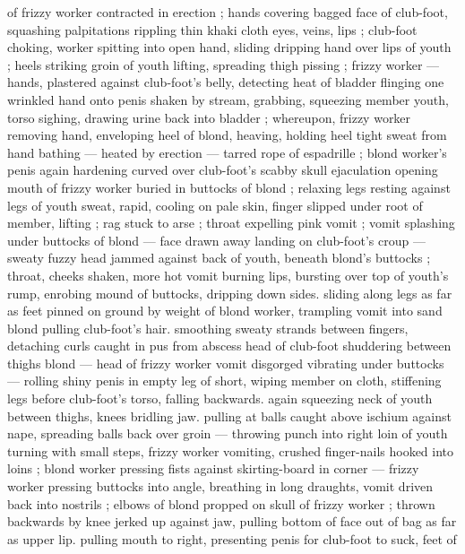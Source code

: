 of frizzy worker contracted in erection ; hands covering bagged face 
of club-foot, squashing palpitations rippling thin khaki cloth {\col} eyes, 
veins, lips ; club-foot choking, worker spitting into open hand, sliding 
dripping hand over lips of youth ; heels striking groin of youth lifting, 
spreading thigh {\col} pissing ; frizzy worker --- hands, plastered against 
club-foot's belly, detecting heat of bladder {\dashcom} flinging one wrinkled 
hand onto penis shaken by stream, grabbing, squeezing member {\col}
youth, torso sighing, drawing urine back into bladder ; whereupon, 
frizzy worker removing hand, enveloping heel of blond, heaving, 
holding heel tight {\col} sweat from hand bathing --- heated by erection 
--- tarred rope of espadrille ; blond worker's penis again hardening 
curved over club-foot's scabby skull {\crpage} ejaculation opening mouth of 
frizzy worker buried in buttocks of blond ; relaxing legs resting 
against legs of youth {\col} sweat, rapid, cooling on pale skin, finger 
slipped under root of member, lifting ; rag stuck to arse ; throat 
expelling pink vomit ; vomit splashing under buttocks of blond --- 
face drawn away {\dashcom} landing on club-foot's croup --- sweaty fuzzy 
head jammed against back of youth, beneath blond's buttocks ; 
throat, cheeks shaken, more hot vomit burning lips, bursting over top 
of youth's rump, enrobing mound of buttocks, dripping down sides. 
sliding along legs as far as feet pinned on ground by weight of blond 
worker, trampling vomit into sand {\col} blond pulling club-foot's hair. 
smoothing sweaty strands between fingers, detaching curls caught in 
pus from abscess {\col} head of club-foot shuddering between thighs 
blond --- head of frizzy worker vomit disgorged vibrating under 
buttocks --- rolling shiny penis in empty leg of short, wiping member 
on cloth, stiffening legs before club-foot's torso, falling backwards. 
again squeezing neck of youth between thighs, knees bridling jaw. 
pulling at balls caught above ischium against nape, spreading balls 
back over groin --- throwing punch into right loin of youth turning 
with small steps, frizzy worker vomiting, crushed finger-nails hooked 
into loins ; blond worker pressing fists against skirting-board in 
corner --- frizzy worker pressing buttocks into angle, breathing in 
long draughts, vomit driven back into nostrils ; elbows of blond 
propped on skull of frizzy worker ; thrown backwards by knee jerked 
up against jaw, pulling bottom of face out of bag as far as upper lip. 
pulling mouth to right, presenting penis for club-foot to suck, feet of 
